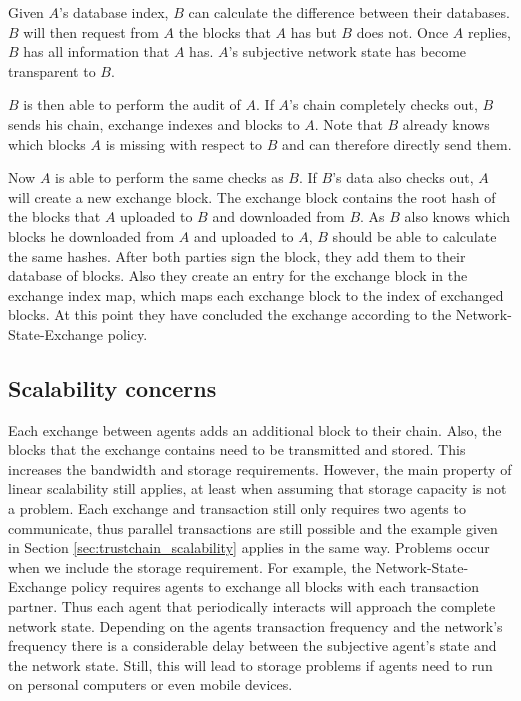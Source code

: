 Given $A$'s database index, $B$ can calculate the difference between their databases. $B$ will 
then request from $A$ the blocks that $A$ has but $B$ does not. Once $A$ replies, $B$ has all 
information that $A$ has. $A$'s subjective network state has become transparent to $B$. 

$B$ is then able to perform the audit of $A$. If $A$'s chain completely checks out, $B$ sends his chain, exchange
indexes and blocks to $A$. Note that $B$ already knows which blocks $A$ is missing with respect to 
$B$ and can therefore directly send them. 

Now $A$ is able to perform the same checks as $B$. If $B$'s data also checks out, $A$ will create 
a new exchange block. The exchange block contains the root hash of the blocks that $A$ uploaded to $B$ 
and downloaded from $B$. As $B$ also knows which blocks he downloaded from $A$ and uploaded to $A$, $B$ should
be able to calculate the same hashes. After both parties sign the block, they add them to their 
database of blocks. Also they create an entry for the exchange block in the exchange index map, which 
maps each exchange block to the index of exchanged blocks. At this point they have concluded the 
exchange according to the Network-State-Exchange policy.

\subsection{Scalability concerns}
Each exchange between agents adds an additional block to their chain. Also, the blocks that the 
exchange contains need to be transmitted and stored. This increases the bandwidth and storage 
requirements. However, the main property of linear scalability 
still applies, at least when assuming that storage capacity is not a problem. Each exchange and 
transaction still only requires two agents to communicate, thus parallel transactions are still 
possible and the example given in Section \ref{sec:trustchain_scalability} applies in the same way.
Problems occur when we include the storage requirement. For example, the Network-State-Exchange policy
requires agents to exchange all blocks with each transaction partner. Thus each agent that periodically
interacts will approach the complete network state. Depending on the agents transaction frequency and
the network's frequency there is a considerable delay between the subjective agent's state and the
network state. Still, this will lead to storage problems if agents need to run on personal computers
or even mobile devices.

